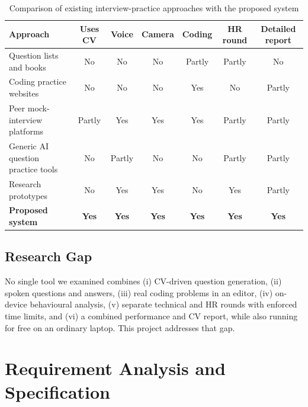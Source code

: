 \documentclass[12pt,a4paper,oneside]{report}
\begin{document}
\begin{table}[H]
\centering
\caption{Comparison of existing interview-practice approaches with the proposed system}
\label{tab:existing}
\small
\begin{tabularx}{\textwidth}{@{}Ycccccc@{}}
\toprule
\textbf{Approach} & \textbf{Uses CV} & \textbf{Voice} & \textbf{Camera} & \textbf{Coding} & \textbf{HR round} & \textbf{Detailed report} \\
\midrule
Question lists and books \cite{mcdowell2015} & No & No & No & Partly & Partly & No \\
Coding practice websites & No & No & No & Yes & No & Partly \\
Peer mock-interview platforms & Partly & Yes & Yes & Yes & Partly & Partly \\
Generic AI question practice tools & No & Partly & No & No & Partly & Partly \\
Research prototypes \cite{hoque2013,naim2018} & No & Yes & Yes & No & Yes & Partly \\
\textbf{Proposed system} & \textbf{Yes} & \textbf{Yes} & \textbf{Yes} & \textbf{Yes} & \textbf{Yes} & \textbf{Yes} \\
\bottomrule
\end{tabularx}
\end{table}

\section{Research Gap}
No single tool we examined combines (i) CV-driven question generation, (ii) spoken questions and answers, (iii) real coding problems in an editor, (iv) on-device behavioural analysis, (v) separate technical and HR rounds with enforced time limits, and (vi) a combined performance and CV report, while also running for free on an ordinary laptop. This project addresses that gap.

\chapter{Requirement Analysis and Specification}\label{ch:req}
\end{document}
